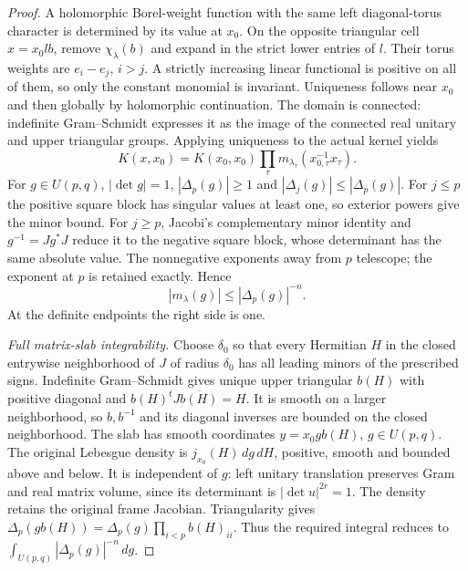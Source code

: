 \begin{proof}
A holomorphic Borel-weight function with the same left
diagonal-torus character is determined by its value at $x_0$.
On the opposite triangular cell $x=x_0lb$, remove
$\chi_\lambda(b)$ and expand in the strict lower entries
of $l$. Their torus weights are $e_i-e_j$, $i>j$.
A strictly increasing linear functional is positive on
all of them, so only the constant monomial is invariant.
Uniqueness follows near $x_0$ and then globally by
holomorphic continuation. The domain is connected:
indefinite Gram--Schmidt expresses it as the image of
the connected real unitary and upper triangular groups.
Applying uniqueness to the actual kernel yields
\begin{equation}\label{gaussian-minor-formula}
 K(x,x_0)=K(x_0,x_0)\prod_\tau
                     m_{\lambda_\tau}(x_{0,\tau}^{-1}x_\tau).
\end{equation}
For $g\in U(p,q)$, $|\det g|=1$,
$|\Delta_p(g)|\ge1$ and $|\Delta_j(g)|\le|\Delta_p(g)|$.
For $j\le p$ the positive square block has singular values
at least one, so exterior powers give the minor bound.
For $j\ge p$, Jacobi's complementary minor identity and
$g^{-1}=Jg^*J$ reduce it to the negative square block,
whose determinant has the same absolute value.
The nonnegative exponents away from $p$ telescope;
the exponent at $p$ is retained exactly. Hence
\begin{equation}\label{gaussian-minor-decay}
                         |m_\lambda(g)|\le|\Delta_p(g)|^{-n}.
\end{equation}
At the definite endpoints the right side is one.

\emph{Full matrix-slab integrability.}
Choose $\delta_0$ so that every Hermitian $H$ in the
closed entrywise neighborhood of $J$ of radius $\delta_0$
has all leading minors of the prescribed signs.
Indefinite Gram--Schmidt gives unique upper triangular
$b(H)$ with positive diagonal and
$b(H)^tJ\overline{b(H)}=H$. It is smooth on a larger
neighborhood, so $b,b^{-1}$ and its diagonal inverses
are bounded on the closed neighborhood.
The slab has smooth coordinates $y=x_0g b(H)$,
$g\in U(p,q)$. The original Lebesgue density is
$j_{x_0}(H)\,dg\,dH$, positive, smooth and bounded above
and below. It is independent of $g$: left unitary
translation preserves Gram and real matrix volume,
since its determinant is $|\det u|^{2r}=1$.
The density retains the original frame Jacobian.
Triangularity gives
$\Delta_p(gb(H))=\Delta_p(g)\prod_{i<p}b(H)_{ii}$.
Thus the required integral reduces to
$\int_{U(p,q)}|\Delta_p(g)|^{-n}\,dg$.


\end{proof}
